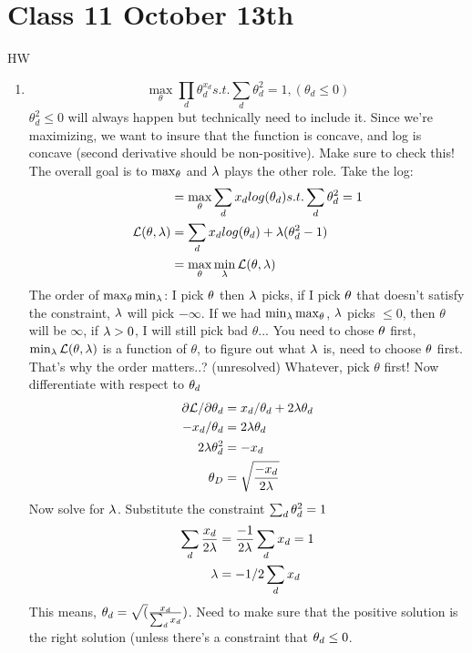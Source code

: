 \section{Class 11 October 13th}
\label{sec:class11}

HW
\begin{enumerate}
\item $$\max_\theta \prod_d \theta_d^{x_d} s.t. \sum_d \theta_d^2 = 1,
  (\theta_d\le 0)$$ $\theta_d^2 \le 0$ will always happen but
  technically need to include it. Since we're maximizing, we want to
  insure that the function is concave, and log is concave (second
  derivative should be non-positive). Make sure to check this! The
  overall goal is to $\max_\theta$ and $\lambda$ plays the other role. Take the log:
  \begin{align*}
    &=\max_\theta \sum_d x_d log(\theta_d) s.t. \sum_d \theta_d^2 = 1\\
\mathcal{L}(\theta, \lambda)&=\sum_d x_d log(\theta_d)+ \lambda(\theta_d^2
-1)\\
&=\max_\theta \min_\lambda \mathcal{L}(\theta, \lambda)
  \end{align*}
The order of $\max_\theta \min_\lambda$: I pick $\theta$ then $\lambda$ picks,
if I pick $\theta$ that doesn't satisfy the constraint, $\lambda$ will
pick $-\infty$. If we had $\min_\lambda \max_\theta$, $\lambda$ picks $\le 0$, then
$\theta$ will be $\infty$, if $\lambda > 0$, I will still pick bad
$\theta$... You need to chose $\theta$ first, $\min_\lambda
\mathcal{L}(\theta, \lambda)$ is a function of $\theta$, to figure out
what $\lambda$ is, need to choose $\theta$ first. That's why the order
matters..? (unresolved) Whatever, pick $\theta$ first!
Now differentiate with respect to $\theta_d$
\begin{align*}
  \partial \mathcal{L}/\partial \theta_d &= x_d/\theta_d + 2\lambda
  \theta_d\\
-x_d/\theta_d &= 2\lambda \theta_d\\
2\lambda \theta_d^2 &= - x_d\\
\theta_D &= \sqrt{\frac{-x_d}{2\lambda}}
\end{align*}
Now solve for $\lambda$. Substitute the constraint $\sum_d\theta_d^2 = 1$
\begin{align*}
  \sum_d \frac{x_d}{2\lambda}&= \frac{-1}{2\lambda}\sum_{d}x_d = 1\\
\lambda &= -1/2 \sum_d x_d
\end{align*}
This means, $\theta_d = \sqrt(\frac{x_d}{\sum_d x_d})$. Need to make
sure that the positive solution is the right solution (unless there's
a constraint that $\theta_d \le 0$.
\end{enumerate}

